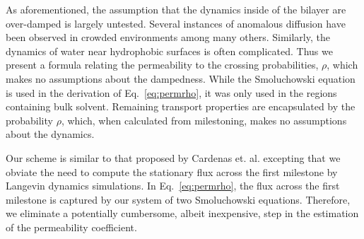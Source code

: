 	\par As aforementioned, the assumption that the dynamics inside of the bilayer are over-damped is largely untested. Several instances of anomalous diffusion have been observed in crowded environments among many others\cite{Sokolov2012,Banks2005,Regner2013,Berezhkovskii2014a,McGuffee2010}. Similarly, the dynamics of water near hydrophobic surfaces is often complicated\cite{Setny2013}. Thus we present a formula relating the permeability to the crossing  probabilities, $\rho$, which makes no assumptions about the dampedness. While the Smoluchowski equation is used in the derivation of Eq.~\ref{eq:permrho}, it was only used in the regions containing bulk solvent. Remaining transport properties are encapsulated by the probability $\rho$, which, when calculated from milestoning, makes no assumptions about the dynamics.

	\par Our scheme is similar to that proposed by Cardenas et. al.\cite{Cardenas2013,Cardenas2014} excepting that we obviate the need to compute the stationary flux across the first milestone by Langevin dynamics simulations. In Eq.~\ref{eq:permrho}, the flux across the first milestone is captured by our system of two Smoluchowski equations. Therefore, we eliminate a potentially cumbersome, albeit inexpensive, step in the estimation of the permeability coefficient.

